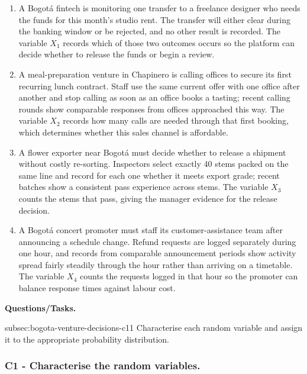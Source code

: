 	\begin{enumerate}
		\item A Bogotá fintech is monitoring one transfer to a freelance designer who needs the funds for this month's studio rent. The transfer will either clear during the banking window or be rejected, and no other result is recorded. The variable \(X_1\) records which of those two outcomes occurs so the platform can decide whether to release the funds or begin a review.
		\item A meal-preparation venture in Chapinero is calling offices to secure its first recurring lunch contract. Staff use the same current offer with one office after another and stop calling as soon as an office books a tasting; recent calling rounds show comparable responses from offices approached this way. The variable \(X_2\) records how many calls are needed through that first booking, which determines whether this sales channel is affordable.
		\item A flower exporter near Bogotá must decide whether to release a shipment without costly re-sorting. Inspectors select exactly 40 stems packed on the same line and record for each one whether it meets export grade; recent batches show a consistent pass experience across stems. The variable \(X_3\) counts the stems that pass, giving the manager evidence for the release decision.
		\item A Bogotá concert promoter must staff its customer-assistance team after announcing a schedule change. Refund requests are logged separately during one hour, and records from comparable announcement periods show activity spread fairly steadily through the hour rather than arriving on a timetable. The variable \(X_4\) counts the requests logged in that hour so the promoter can balance response times against labour cost.
	\end{enumerate}

	\textbf{Questions/Tasks.}
	\begin{enumerate}
		\CriterionTask
		{subsec:bogota-venture-decisions-c1}{1}
		{Characterise each random variable and assign it to the appropriate probability distribution.}
	\end{enumerate}

	\subsubsection*{C1 - Characterise the random variables.}
	\label{subsec:bogota-venture-decisions-c1}

